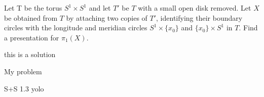 \documentclass{article}
\begin{document}
\begin{problem}{1}{\parindent}
  Let T be the torus $S^1 \times S^1$ and let $T'$ be $T$ with a small
  open disk removed. Let $X$ be obtained from $T$ by attaching two
  copies of $T'$, identifying their boundary circles with the
  longitude and meridian circles $S^1 \times \{x_0\}$ and $\{x_0\}
  \times S^1$ in $T$. Find a presentation for $\pi_1(X)$.
\end{problem}

\begin{solution}{\parindent}
  this is a solution
\end{solution}

\begin{problem}{2}{\parindent}
  My problem
\end{problem}

\begin{solution}{\parindent}{\parindent}
  
\end{solution}

\begin{exercise}{S+S 1.3}{\parindent}
  yolo
\end{exercise}
\end{document}
